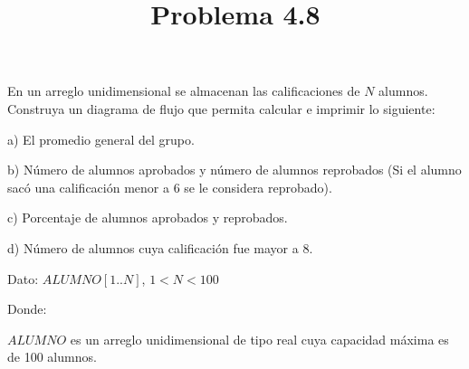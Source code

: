 \documentclass[11pt]{amsart}
\title{Problema 4.8}
\author{}
\date{}
\begin{document}
\maketitle

En un arreglo unidimensional se almacenan las calificaciones de $N$ alumnos. Construya un diagrama de flujo que permita calcular e imprimir lo siguiente:

a) El promedio general del grupo.

b) Número de alumnos aprobados y número de alumnos reprobados (Si el alumno sacó una calificación menor a 6 se le considera reprobado).

c) Porcentaje de alumnos aprobados y reprobados.

d) Número de alumnos cuya calificación fue mayor a 8.

Dato: $ALUMNO[1..N]$, $1 < N < 100$

Donde:

$ALUMNO$ es un arreglo unidimensional de tipo real cuya capacidad máxima es de 100 alumnos.
\end{document}
